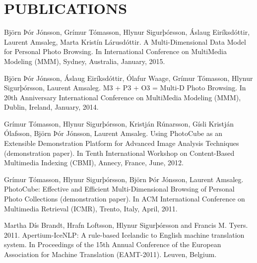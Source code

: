 \section{PUBLICATIONS}
Björn Þór Jónsson, Grímur Tómasson, Hlynur Sigurþórsson, Áslaug Eiríksdóttir, Laurent Amsaleg, Marta Kristín Lárusdóttir.  A Multi-Dimensional Data Model for Personal Photo Browsing.  In International Conference on MultiMedia Modeling (MMM), Sydney, Australia, January, 2015.

Björn Þór Jónsson, Áslaug Eiríksdóttir, Ólafur Waage, Grímur Tómasson, Hlynur Sigurþórsson, Laurent Amsaleg.  M3 + P3 + O3 = Multi-D Photo Browsing.  In 20th Anniversary International Conference on MultiMedia Modeling (MMM), Dublin, Ireland, January, 2014.

Grímur Tómasson, Hlynur Sigurþórsson, Kristján Rúnarsson, Gísli Kristján Ólafsson, Björn Þór Jónsson, Laurent Amsaleg.  Using PhotoCube as an Extensible Demonstration Platform for Advanced Image Analysis Techniques (demonstration paper).  In Tenth International Workshop on Content-Based Multimedia Indexing (CBMI), Annecy, France, June, 2012.

Grímur Tómasson, Hlynur Sigurþórsson, Björn Þór Jónsson, Laurent Amsaleg. PhotoCube: Effective and Efficient Multi-Dimensional Browsing of Personal Photo Collections (demonstration paper).  In ACM International Conference on Multimedia Retrieval (ICMR), Trento, Italy, April, 2011.

Martha Dís Brandt, Hrafn Loftsson, Hlynur Sigurþórsson and Francis M. Tyers. 2011. Apertium-IceNLP: A rule-based Icelandic to English machine translation system. In Proceedings of the 15th Annual Conference of the European Association for Machine Translation (EAMT-2011). Leuven, Belgium.
